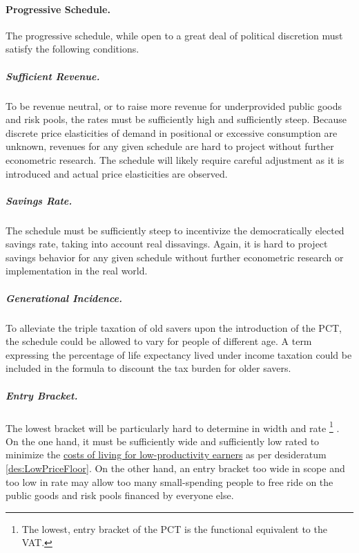\paragraph{Progressive Schedule.} The progressive schedule, while open to a great deal of political discretion must satisfy the following conditions.
\subparagraph{Sufficient Revenue.} To be revenue neutral, or to raise more revenue for underprovided public goods and risk pools, the rates must be sufficiently high and sufficiently steep.
Because discrete price elasticities of demand in positional or excessive consumption are unknown, revenues for any given schedule are hard to project without further econometric research.
The schedule will likely require careful adjustment as it is introduced and actual price elasticities are observed.
\subparagraph{Savings Rate.} The schedule must be sufficiently steep to incentivize the democratically elected savings rate, taking into account real dissavings.
Again, it is hard to project savings behavior for any given schedule without further econometric research or implementation in the real world.
\subparagraph{Generational Incidence.} To alleviate the triple taxation of old savers upon the introduction of the PCT, the schedule could be allowed to vary for people of different age.
A term expressing the percentage of life expectancy lived under income taxation could be included in the formula to discount the tax burden for older savers.
\subparagraph{Entry Bracket.} The lowest bracket will be particularly hard to determine in width and rate
\footnote{
	The lowest, entry bracket of the PCT is the functional equivalent to the VAT.
}
.
On the one hand, it must be sufficiently wide and sufficiently low rated to minimize the \hyperref[des:LowPriceFloor]{costs of living for low-productivity earners} as per desideratum \ref{des:LowPriceFloor}.
On the other hand, an entry bracket too wide in scope and too low in rate may allow too many small-spending people to free ride on the public goods and risk pools financed by everyone else.

